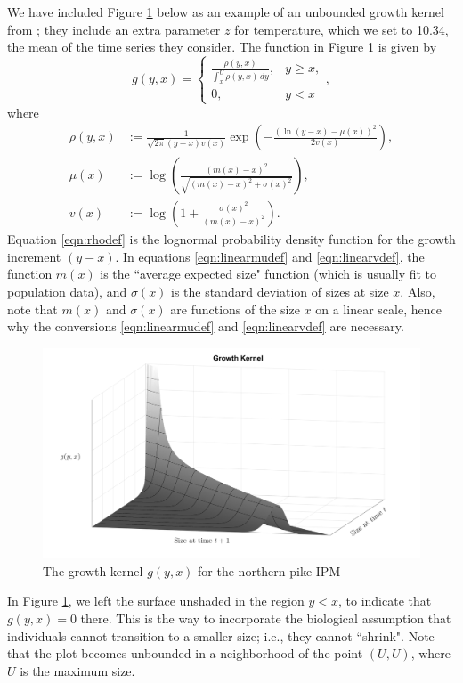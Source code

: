 \begin{example}
	We have included Figure \ref{fig:growth-kernel-plot} below as an example of an unbounded growth kernel from \cite{Vindenes2014}; they include an extra parameter $z$ for temperature, which we set to 10.34, the mean of the time series they consider. The function in Figure \ref{fig:growth-kernel-plot} is given by
	\[g(y, x) = \left\{ \begin{array}{lc} \frac{\rho(y, x)}{\int_x^U \rho(y, x) \, dy}, & y \geq x, \\ 0, & y < x \end{array} \right. ,\]
	where
\begin{align}
	\rho(y, x) &:= \frac{1}{\sqrt{2 \pi}(y - x) v(x)} \exp \left( - \frac{(\ln(y - x) - \mu(x))^2}{2 v(x)} \right), \label{eqn:rhodef}\\
	\mu(x) &:= \log \left( \frac{(m(x)-x)^2}{\sqrt{(m(x) - x)^2 + \sigma(x)^2}}\right), \label{eqn:linearmudef} \\
	v(x) &:= \log \left( 1 + \frac{\sigma(x)^2}{(m(x)-x)^2}\right).	\label{eqn:linearvdef}
\end{align}
	Equation \ref{eqn:rhodef} is the lognormal probability density function for the growth increment $(y - x)$. In equations \eqref{eqn:linearmudef} and \eqref{eqn:linearvdef}, the function $m(x)$ is the ``average expected size" function (which is usually fit to population data), and $\sigma(x)$ is the standard deviation of sizes at size $x$. Also, note that $m(x)$ and $\sigma(x)$ are functions of the size $x$ on a linear scale, hence why the conversions \eqref{eqn:linearmudef} and \eqref{eqn:linearvdef} are necessary.
	\begin{center}
		\begin{figure}
			\centering
			\includegraphics[width=\textwidth]{"Images/Growth Kernel Plot"}
			\caption{The growth kernel $g(y,x)$ for the northern pike IPM} \label{fig:growth-kernel-plot}
		\end{figure}
	\end{center}
	In Figure \ref{fig:growth-kernel-plot}, we left the surface unshaded in the region $y < x$, to indicate that $g(y,x) = 0$ there. This is the way to incorporate the biological assumption that individuals cannot transition to a smaller size; i.e., they cannot ``shrink". Note that the plot becomes unbounded in a neighborhood of the point $(U,U)$, where $U$ is the maximum size.
	
\end{example}

